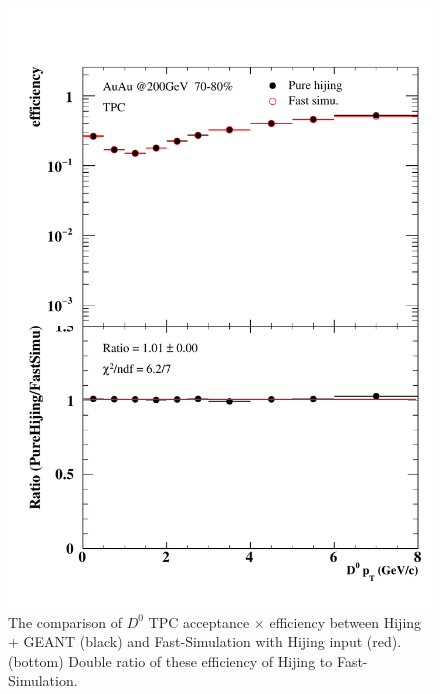 \begin{figure}[htbp]
\begin{minipage}[htbp]{0.47\linewidth}
\end{minipage}
\hfill
\begin{minipage}[htbp]{0.47\linewidth}
\centering
\includegraphics[width=1.0\textwidth,angle=0]{figure/Run14_D0HFT/70_80_1_1.pdf} 
\caption{ The comparison of $D^0$ TPC acceptance $\times$ efficiency between Hijing + GEANT (black) and Fast-Simulation with Hijing input (red). (bottom) Double ratio of these efficiency of Hijing to Fast-Simulation.\label{70_80_1}}
\end{minipage}
\end{figure}

